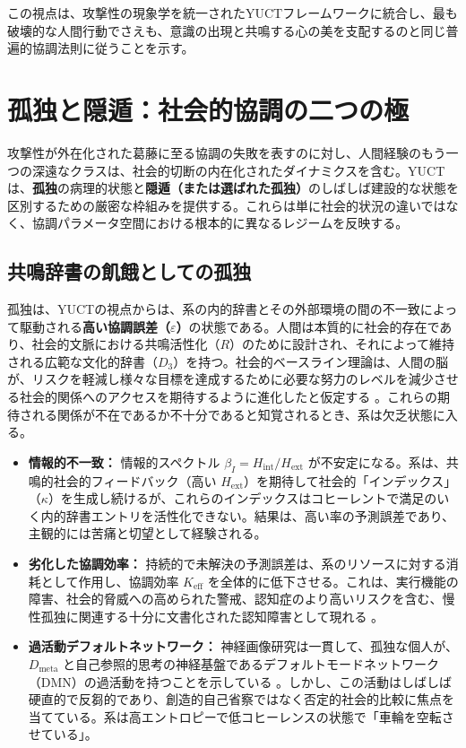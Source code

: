 \documentclass[12pt,a4paper]{article}
\begin{document}
	この視点は、攻撃性の現象学を統一されたYUCTフレームワークに統合し、最も破壊的な人間行動でさえも、意識の出現と共鳴する心の美を支配するのと同じ普遍的協調法則に従うことを示す。
	
	\section{孤独と隠遁：社会的協調の二つの極}
	
	攻撃性が外在化された葛藤に至る協調の失敗を表すのに対し、人間経験のもう一つの深遠なクラスは、社会的切断の内在化されたダイナミクスを含む。YUCTは、\textbf{孤独}の病理的状態と\textbf{隠遁（または選ばれた孤独）}のしばしば建設的な状態を区別するための厳密な枠組みを提供する。これらは単に社会的状況の違いではなく、協調パラメータ空間における根本的に異なるレジームを反映する。
	
	\subsection{共鳴辞書の飢餓としての孤独}
	
	孤独は、YUCTの視点からは、系の内的辞書とその外部環境の間の不一致によって駆動される\textbf{高い協調誤差（\(\varepsilon\)）}の状態である。人間は本質的に社会的存在であり、社会的文脈における共鳴活性化（\(R\)）のために設計され、それによって維持される広範な文化的辞書（\(D_3\)）を持つ。社会的ベースライン理論は、人間の脳が、リスクを軽減し様々な目標を達成するために必要な努力のレベルを減少させる社会的関係へのアクセスを期待するように進化したと仮定する \cite{Beckes2015}。これらの期待される関係が不在であるか不十分であると知覚されるとき、系は欠乏状態に入る。
	
	\begin{itemize}
		\item \textbf{情報的不一致：} 情報的スペクトル \(\beta_I = H_{\mathrm{int}}/H_{\mathrm{ext}}\) が不安定になる。系は、共鳴的社会的フィードバック（高い \(H_{\mathrm{ext}}\)）を期待して社会的「インデックス」（\(\kappa\)）を生成し続けるが、これらのインデックスはコヒーレントで満足のいく内的辞書エントリを活性化できない。結果は、高い率の予測誤差であり、主観的には苦痛と切望として経験される。
		\item \textbf{劣化した協調効率：} 持続的で未解決の予測誤差は、系のリソースに対する消耗として作用し、協調効率 \(K_{\mathrm{eff}}\) を全体的に低下させる。これは、実行機能の障害、社会的脅威への高められた警戒、認知症のより高いリスクを含む、慢性孤独に関連する十分に文書化された認知障害として現れる \cite{Finley2025}。
		\item \textbf{過活動デフォルトネットワーク：} 神経画像研究は一貫して、孤独な個人が、\(D_{\text{meta}}\) と自己参照的思考の神経基盤であるデフォルトモードネットワーク（DMN）の過活動を持つことを示している \cite{Spreng2020}。しかし、この活動はしばしば硬直的で反芻的であり、創造的自己省察ではなく否定的社会的比較に焦点を当てている。系は高エントロピーで低コヒーレンスの状態で「車輪を空転させている」。
	\end{itemize}
	
\end{document}
